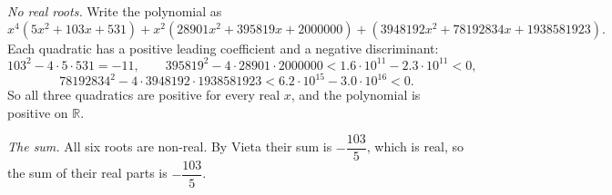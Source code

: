 \emph{No real roots.} Write the polynomial as
\[x^4\left(5x^2+103x+531\right)+x^2\left(28901x^2+395819x+2000000\right)+\left(3948192x^2+78192834x+1938581923\right).\]
Each quadratic has a positive leading coefficient and a negative discriminant:
\[103^2-4\cdot5\cdot531=-11,\qquad395819^2-4\cdot28901\cdot2000000<1.6\cdot10^{11}-2.3\cdot10^{11}<0,\]
\[78192834^2-4\cdot3948192\cdot1938581923<6.2\cdot10^{15}-3.0\cdot10^{16}<0.\]
So all three quadratics are positive for every real $x$, and the polynomial is positive on $\mathbb R$.

\emph{The sum.} All six roots are non-real. By Vieta their sum is $-\dfrac{103}{5}$, which is real, so the sum of their real parts is $\boxed{-\dfrac{103}{5}}$.
